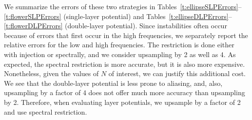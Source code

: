 We summarize the errors of these two strategies in
Tables~\ref{t:ellipseSLPErrors}--\ref{t:flowerSLPErrors} (single-layer
potential) and Tables~\ref{t:ellipseDLPErrors}--\ref{t:flowerDLPErrors}
(double-layer potential).  Since instabilities often occur because of
errors that first occur in the high frequencies, we separately report
the relative errors for the low and high frequencies.  The restriction
is done either with injection or spectrally, and we consider upsampling
by 2 as well as 4.  As expected, the spectral restriction is more
accurate, but it is also more expensive.  Nonetheless, given the values
of $N$ of interest, we can justify this additional cost.  We see that
the double-layer potential is less prone to aliasing, and, also,
upsampling by a factor of 4 does not offer much more accuracy than
upsampling by 2.  Therefore, when evaluating layer potentials, we
upsample by a factor of 2 and use spectral restriction.



